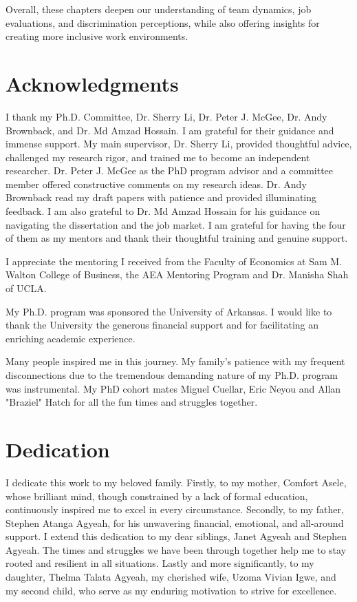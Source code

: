 Overall, these chapters deepen our understanding of team dynamics, job evaluations, and discrimination perceptions, while also offering insights for creating more inclusive work environments.

\thispagestyle{empty} %
\clearpage


\section*{\centering Acknowledgments}
I thank my Ph.D. Committee, Dr. Sherry Li, Dr. Peter J. McGee, Dr. Andy Brownback, and Dr. Md Amzad Hossain. I am grateful for their guidance and immense support. My main supervisor, Dr. Sherry Li, provided thoughtful advice, challenged my research rigor, and trained me to become an independent researcher. Dr. Peter J. McGee as the PhD program advisor and a committee member offered constructive comments on my research ideas. Dr. Andy Brownback read my draft papers with patience and provided illuminating feedback. I am also grateful to Dr. Md Amzad Hossain for his guidance on navigating the dissertation and the job market.  I am grateful for having the four of them as my mentors and thank their thoughtful training and genuine support.
 
I appreciate the mentoring I received from the Faculty of Economics at Sam M. Walton College of Business, the AEA Mentoring Program and Dr. Manisha Shah of UCLA. 

My Ph.D. program was sponsored the University of Arkansas. I would like to thank the University the generous financial support and for facilitating an enriching academic experience. 

Many people inspired me in this journey. My family's patience with my frequent disconnections due to the tremendous demanding nature of my Ph.D. program was instrumental. My PhD cohort mates Miguel Cuellar, Eric Neyou and Allan "Braziel" Hatch for all the fun times and struggles together.  



\thispagestyle{empty} %
\clearpage



\section*{\centering \textbf{Dedication}}

I dedicate this work to my beloved family. Firstly, to my mother, Comfort Asele, whose brilliant mind, though constrained by a lack of formal education, continuously inspired me to excel in every circumstance. Secondly, to my father, Stephen Atanga Agyeah, for his unwavering financial, emotional, and all-around support. I extend this dedication to my dear siblings, Janet Agyeah and Stephen Agyeah. The times and struggles we have been through together help me to stay rooted and resilient in all situations. Lastly and more significantly, to my daughter, Thelma Talata Agyeah, my cherished wife, Uzoma Vivian Igwe, and my second child, who serve as my enduring motivation to strive for excellence.


